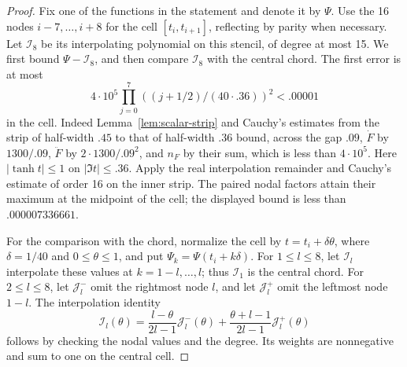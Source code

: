 \begin{proof}
Fix one of the functions in the statement and denote it by \(\Psi\).
Use the 16 nodes \(i-7,\ldots,i+8\) for the cell \([t_i,t_{i+1}]\),
reflecting by parity when necessary. Let \(\mathcal I_8\) be its
interpolating polynomial on this stencil, of degree at most 15.
We first bound \(\Psi-\mathcal I_8\), and then compare
\(\mathcal I_8\) with the central chord. The first error is at most
\[
 4\cdot10^5 \prod_{j=0}^7((j+1/2)/(40\cdot .36))^2 < .00001
\]
in the cell. Indeed Lemma~\ref{lem:scalar-strip} and Cauchy's estimates
from the strip of half-width \(.45\) to that of half-width \(.36\)
bound, across the gap \(.09\),
\(\dot F\) by \(1300/.09\), \(\ddot F\) by
\(2\cdot1300/.09^2\), and \(n_F\) by their sum, which is less than
\(4\cdot10^5\). Here \(|\tanh t|\le1\) on \(|\Im t|\le.36\).
Apply the real interpolation remainder and Cauchy's estimate of order
16 on the inner strip. The paired nodal factors attain their maximum
at the midpoint of the cell; the displayed bound is less than
\(.000007336661\).

For the comparison with the chord, normalize the cell by
\(t=t_i+\delta\theta\), where \(\delta=1/40\) and \(0\le\theta\le1\),
and put \(\Psi_k=\Psi(t_i+k\delta)\).
For \(1\le l\le8\), let \(\mathcal I_l\) interpolate these values at
\(k=1-l,\ldots,l\); thus \(\mathcal I_1\) is the central chord.
For \(2\le l\le8\), let \(\mathcal J_l^-\) omit the rightmost node \(l\), and let
\(\mathcal J_l^+\) omit the leftmost node \(1-l\).
The interpolation identity
\[
 \mathcal I_l(\theta)
 =\frac{l-\theta}{2l-1}\mathcal J_l^-(\theta)
  +\frac{\theta+l-1}{2l-1}\mathcal J_l^+(\theta)
\]
follows by checking the nodal values and the degree. Its weights are
nonnegative and sum to one on the central cell.


\end{proof}
